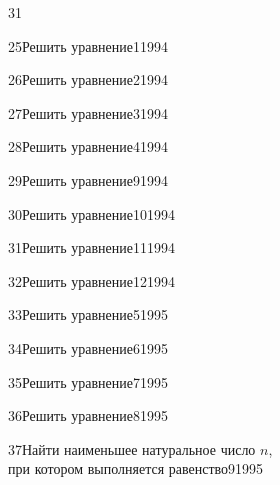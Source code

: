 \begin{TrigSourcePage}{31}
\begin{TrigExercise}{25}{Решить уравнение}{1}{1994}
\end{TrigExercise}
\begin{TrigExercise}{26}{Решить уравнение}{2}{1994}
\end{TrigExercise}
\begin{TrigExercise}{27}{Решить уравнение}{3}{1994}
\end{TrigExercise}
\begin{TrigExercise}{28}{Решить уравнение}{4}{1994}
\end{TrigExercise}
\begin{TrigExercise}{29}{Решить уравнение}{9}{1994}
\end{TrigExercise}
\begin{TrigExercise}{30}{Решить уравнение}{10}{1994}
\end{TrigExercise}
\begin{TrigExercise}{31}{Решить уравнение}{11}{1994}
\end{TrigExercise}
\begin{TrigExercise}{32}{Решить уравнение}{12}{1994}
\end{TrigExercise}
\begin{TrigExercise}{33}{Решить уравнение}{5}{1995}
\end{TrigExercise}
\begin{TrigExercise}{34}{Решить уравнение}{6}{1995}
\end{TrigExercise}
\begin{TrigExercise}{35}{Решить уравнение}{7}{1995}
\end{TrigExercise}
\begin{TrigExercise}{36}{Решить уравнение}{8}{1995}
\end{TrigExercise}
\begin{TrigExercise}{37}{Найти наименьшее натуральное число $n$,\\при котором выполняется равенство}{9}{1995}
\end{TrigExercise}
\end{TrigSourcePage}

